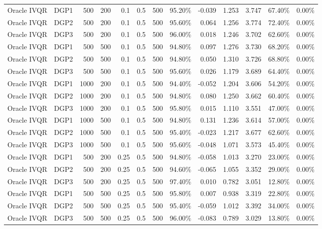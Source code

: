 \begin{landscape}
\begin{longtable}{llrrrrrrrrrrr}
Oracle IVQR & DGP1 & 500 & 200 & 0.1 & 0.5 & 500 & 95.20\% & -0.039 & 1.253 & 3.747 & 67.40\% & 0.00\% \\
Oracle IVQR & DGP2 & 500 & 200 & 0.1 & 0.5 & 500 & 95.60\% & 0.064 & 1.256 & 3.774 & 72.40\% & 0.00\% \\
Oracle IVQR & DGP3 & 500 & 200 & 0.1 & 0.5 & 500 & 96.00\% & 0.018 & 1.246 & 3.702 & 62.60\% & 0.00\% \\
Oracle IVQR & DGP1 & 500 & 500 & 0.1 & 0.5 & 500 & 94.80\% & 0.097 & 1.276 & 3.730 & 68.20\% & 0.00\% \\
Oracle IVQR & DGP2 & 500 & 500 & 0.1 & 0.5 & 500 & 94.80\% & 0.050 & 1.310 & 3.726 & 68.80\% & 0.00\% \\
Oracle IVQR & DGP3 & 500 & 500 & 0.1 & 0.5 & 500 & 95.60\% & 0.026 & 1.179 & 3.689 & 64.40\% & 0.00\% \\
Oracle IVQR & DGP1 & 1000 & 200 & 0.1 & 0.5 & 500 & 94.40\% & -0.052 & 1.204 & 3.606 & 54.20\% & 0.00\% \\
Oracle IVQR & DGP2 & 1000 & 200 & 0.1 & 0.5 & 500 & 94.80\% & 0.080 & 1.250 & 3.662 & 60.40\% & 0.00\% \\
Oracle IVQR & DGP3 & 1000 & 200 & 0.1 & 0.5 & 500 & 95.80\% & 0.015 & 1.110 & 3.551 & 47.00\% & 0.00\% \\
Oracle IVQR & DGP1 & 1000 & 500 & 0.1 & 0.5 & 500 & 94.80\% & 0.131 & 1.236 & 3.614 & 57.00\% & 0.00\% \\
Oracle IVQR & DGP2 & 1000 & 500 & 0.1 & 0.5 & 500 & 95.40\% & -0.023 & 1.217 & 3.677 & 62.60\% & 0.00\% \\
Oracle IVQR & DGP3 & 1000 & 500 & 0.1 & 0.5 & 500 & 95.60\% & -0.048 & 1.071 & 3.573 & 45.40\% & 0.00\% \\
Oracle IVQR & DGP1 & 500 & 200 & 0.25 & 0.5 & 500 & 94.80\% & -0.058 & 1.013 & 3.270 & 23.00\% & 0.00\% \\
Oracle IVQR & DGP2 & 500 & 200 & 0.25 & 0.5 & 500 & 94.60\% & -0.065 & 1.055 & 3.352 & 29.00\% & 0.00\% \\
Oracle IVQR & DGP3 & 500 & 200 & 0.25 & 0.5 & 500 & 97.40\% & 0.010 & 0.782 & 3.051 & 12.80\% & 0.00\% \\
Oracle IVQR & DGP1 & 500 & 500 & 0.25 & 0.5 & 500 & 95.80\% & 0.007 & 0.938 & 3.319 & 22.80\% & 0.00\% \\
Oracle IVQR & DGP2 & 500 & 500 & 0.25 & 0.5 & 500 & 95.40\% & -0.059 & 1.012 & 3.392 & 34.00\% & 0.00\% \\
Oracle IVQR & DGP3 & 500 & 500 & 0.25 & 0.5 & 500 & 96.00\% & -0.083 & 0.789 & 3.029 & 13.80\% & 0.00\% \\

\end{longtable}
\end{landscape}
